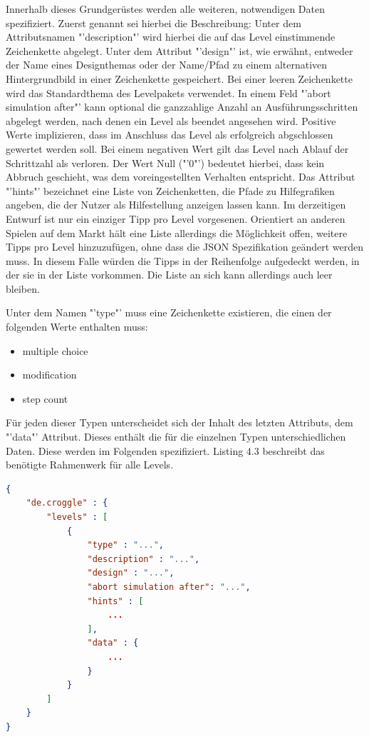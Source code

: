 Innerhalb dieses Grundgerüstes werden alle weiteren, notwendigen Daten spezifiziert.
Zuerst genannt sei hierbei die Beschreibung: Unter dem Attributsnamen "'description"' wird hierbei die auf das Level einstimmende Zeichenkette abgelegt.
Unter dem Attribut "'design"' ist, wie erwähnt, entweder der Name eines Designthemas oder der Name/Pfad zu einem alternativen Hintergrundbild in einer Zeichenkette gespeichert.
Bei einer leeren Zeichenkette wird das Standardthema des Levelpakets verwendet.
In einem Feld "'abort simulation after"' kann optional die ganzzahlige Anzahl an Ausführungsschritten abgelegt werden, nach denen ein Level als beendet angesehen wird.
Positive Werte implizieren, dass im Anschluss das Level als erfolgreich abgschlossen gewertet werden soll.
Bei einem negativen Wert gilt das Level nach Ablauf der Schrittzahl als verloren.
Der Wert Null ("'0"') bedeutet hierbei, dass kein Abbruch geschieht, was dem voreingestellten Verhalten entspricht.
Das Attribut "'hints"' bezeichnet eine Liste von Zeichenketten, die Pfade zu Hilfegrafiken angeben, die der Nutzer als Hilfestellung anzeigen lassen kann.
Im derzeitigen Entwurf ist nur ein einziger Tipp pro Level vorgesenen.
Orientiert an anderen Spielen auf dem Markt hält eine Liste allerdings die Möglichkeit offen, weitere Tipps pro Level hinzuzufügen, ohne dass die JSON Spezifikation geändert werden muss.
In diesem Falle würden die Tipps in der Reihenfolge aufgedeckt werden, in der sie in der Liste vorkommen.
Die Liste an sich kann allerdings auch leer bleiben.

Unter dem Namen "'type"' muss eine Zeichenkette existieren, die einen der folgenden Werte enthalten muss:
\begin{itemize}
	\item multiple choice
	\item modification
	\item step count
\end{itemize}

Für jeden dieser Typen unterscheidet sich der Inhalt des letzten Attributs, dem "'data"' Attribut.
Dieses enthält die für die einzelnen Typen unterschiedlichen Daten.
Diese werden im Folgenden spezifiziert.
Listing 4.3 beschreibt das benötigte Rahmenwerk für alle Levels.
\begin{lstlisting}[language=json,caption={JSON Leveldatei, z.B. json/00/00.json}]
{
	"de.croggle" : {
		"levels" : [
			{
				"type" : "...",
				"description" : "...",
				"design" : "...",
				"abort simulation after": "...",
				"hints" : [
					...
				],
				"data" : {
					...
				}
			}
		]
	}
}
\end{lstlisting}

